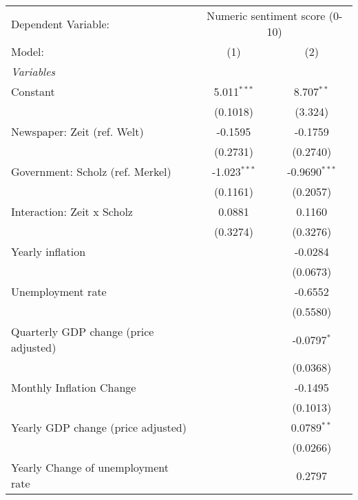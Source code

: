 
\begingroup
\centering
\begin{tabular}{lcc}
   \tabularnewline \midrule \midrule
   Dependent Variable: & \multicolumn{2}{c}{Numeric sentiment score (0-10)}\\
   Model:                                & (1)            & (2)\\  
   \midrule
   \emph{Variables}\\
   Constant                              & 5.011$^{***}$  & 8.707$^{**}$\\   
                                         & (0.1018)       & (3.324)\\   
   Newspaper: Zeit (ref. Welt)           & -0.1595        & -0.1759\\   
                                         & (0.2731)       & (0.2740)\\   
   Government: Scholz (ref. Merkel)      & -1.023$^{***}$ & -0.9690$^{***}$\\   
                                         & (0.1161)       & (0.2057)\\   
   Interaction: Zeit x Scholz            & 0.0881         & 0.1160\\   
                                         & (0.3274)       & (0.3276)\\   
   Yearly inflation                      &                & -0.0284\\   
                                         &                & (0.0673)\\   
   Unemployment rate                     &                & -0.6552\\   
                                         &                & (0.5580)\\   
   Quarterly GDP change (price adjusted) &                & -0.0797$^{*}$\\   
                                         &                & (0.0368)\\   
   Monthly Inflation Change              &                & -0.1495\\   
                                         &                & (0.1013)\\   
   Yearly GDP change (price adjusted)    &                & 0.0789$^{**}$\\   
                                         &                & (0.0266)\\   
   Yearly Change of unemployment rate    &                & 0.2797\\   

\end{tabular}
